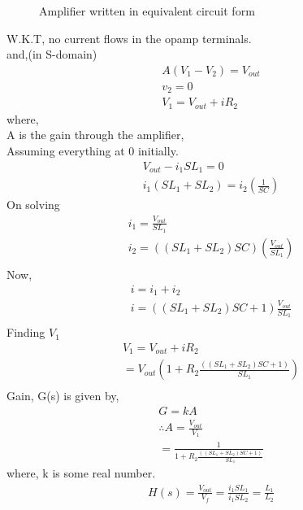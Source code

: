 \begin{enumerate}[label=\thesubsection.\arabic*.,ref=\thesubsection.\theenumi]
\begin{figure}[!ht]
\begin{center}
	\end{center}
\caption{Amplifier written in equivalent circuit form}
\label{fig:ee18btech111019_block3}
\end{figure}
W.K.T, no current flows in the opamp terminals.\\
and,(in S-domain)\\
\begin{align}
    A(V_1 - V_2) = V_{out}\\
    v_2 =0\\
    V_1 = V_{out} + iR_2
\end{align}
where,\\
A is the gain through the amplifier,\\
Assuming everything at 0 initially.\\
\begin{align}
    V_{out} - i_1SL_1 = 0\\
    i_1(SL_1 + SL_2) = i_2(\frac{1}{SC})
\end{align}
On solving\\
\begin{align}
    i_1 = \frac{V_{out}}{SL_1}\\
    i_2 = ((SL_1 + SL_2)SC)(\frac{V_{out}}{SL_1})\\
\end{align}
Now,\\
\begin{align}
    i = i_1 + i_2\\
    i = ((SL_1 + SL_2)SC + 1)\frac{V_{out}}{SL_1}\\
\end{align}
Finding $V_1$
\begin{align}
    V_1 = V_{out} + iR_2 \\
                = V_{out} ( 1 + R_2\frac{((SL_1 + SL_2)SC + 1)}{SL_1})\\
\end{align}
Gain, G(s) is given by,
\begin{align}
G = kA\\
\therefore A = \frac{V_{out}}{V_1}\\
    = \frac{1}{1 + R_2\frac{((SL_1 + SL_2)SC + 1)}{SL_1}}
\end{align}
where, k is some real number.\\
\begin{align}
H(s) = \frac{V_{out}}{V_{f}} =\frac{ i_1SL_1}{i_1SL_2}
    = \frac{L_1}{L_2}
\label{eq:ee18btech111019_B_gain}      
\end{align}




\end{enumerate}
